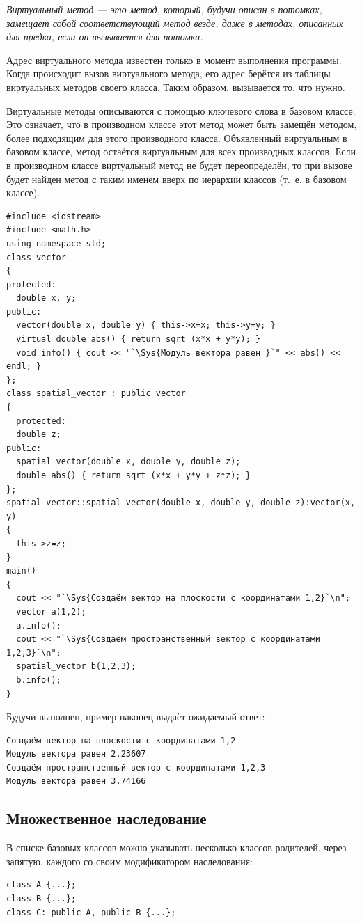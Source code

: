 \emph{Виртуальный метод --- это метод, который, будучи описан в потомках, замещает
собой соответствующий метод везде, даже в методах, описанных для предка, если он вызывается для потомка.}

Адрес виртуального метода известен только в момент выполнения программы. Когда происходит вызов виртуального метода, его
адрес берётся из таблицы виртуальных методов своего класса. Таким образом, вызывается то, что нужно.

Виртуальные методы описываются с помощью ключевого слова  в базовом классе. Это означает,
что в производном классе этот метод может быть замещён методом, более подходящим для этого производного класса.
Объявленный виртуальным в базовом классе, метод остаётся виртуальным для всех производных классов. Если в производном
классе виртуальный метод не будет переопределён, то при вызове будет найден метод с таким именем вверх по иерархии
классов (т.~е. в базовом классе).
\begin{lstlisting}
#include <iostream>
#include <math.h>
using namespace std;
class vector 
{
protected:
  double x, y;
public:
  vector(double x, double y) { this->x=x; this->y=y; }
  virtual double abs() { return sqrt (x*x + y*y); }
  void info() { cout << "`\Sys{Модуль вектора равен }`" << abs() << endl; }
};
class spatial_vector : public vector 
{
  protected:
  double z;
public:
  spatial_vector(double x, double y, double z);
  double abs() { return sqrt (x*x + y*y + z*z); }
};
spatial_vector::spatial_vector(double x, double y, double z):vector(x, y) 
{
  this->z=z;
}
main() 
{
  cout << "`\Sys{Создаём вектор на плоскости с координатами 1,2}`\n";
  vector a(1,2);
  a.info();
  cout << "`\Sys{Создаём пространственный вектор с координатами 1,2,3}`\n";
  spatial_vector b(1,2,3);
  b.info();
}
\end{lstlisting}

Будучи выполнен, пример наконец выдаёт ожидаемый ответ:
\begin{verbatim}
Создаём вектор на плоскости с координатами 1,2 
Модуль вектора равен 2.23607 
Создаём пространственный вектор с координатами 1,2,3 
Модуль вектора равен 3.74166 
\end{verbatim}

\subsection[Множественное наследование]{Множественное наследование}
В списке базовых классов можно указывать несколько классов-родителей,
через запятую, каждого со своим модификатором наследования:
\begin{lstlisting}
class A {...};
class B {...};
class C: public A, public B {...};
\end{lstlisting}

